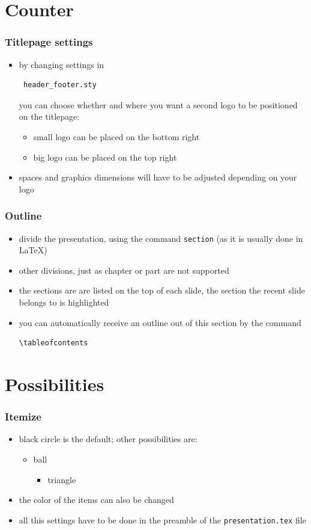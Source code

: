 \documentclass{beamer}
\begin{document}
\section{Counter}

\begin{frame}[fragile]
\frametitle{Titlepage settings}
\begin{itemize}
\item by changing settings in \begin{verbatim} header_footer.sty \end{verbatim} you can choose whether and where you want a second logo to be positioned on the titlepage:
\begin{itemize}
\item small logo can be placed on the bottom right
\item big logo can be placed on the top right
\end{itemize}
\item spaces and graphics dimensions will have to be adjusted depending on your logo
\end{itemize}
\end{frame}

\begin{frame}[fragile]
\frametitle{Outline}
\begin{itemize}
\item divide the presentation, using the command {\tt section}
(as it is usually done in \LaTeX)
\item other divisions, just as chapter or part are not supported
\item the sections are are listed on the top of each slide, the section the
recent slide belongs to is highlighted
\item you can automatically receive an outline out of this section by the command
\begin{verbatim}
\tableofcontents
\end{verbatim}
\end{itemize}
\end{frame}


\section{Possibilities}

\begin{frame}
\frametitle{Itemize}
\begin{itemize}
\item black circle is the default; other possibilities are:
\begin{itemize}
\item ball
\begin{itemize}
\item triangle
\end{itemize}
\end{itemize}
\item the color of the items can also be changed
\item all this settings have to be done in the preamble of the {\tt presentation.tex} file
\end{itemize}
\end{frame}
\end{document}
